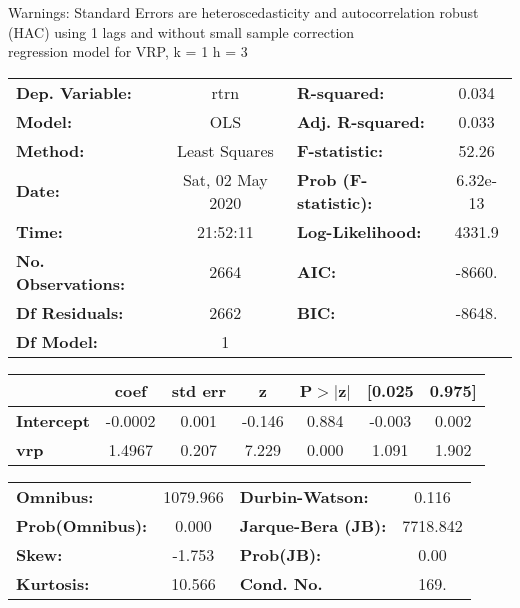 Warnings: \newline
 [1] Standard Errors are heteroscedasticity and autocorrelation robust (HAC) using 1 lags and without small sample correction\\ 

regression model for VRP, k = 1 h = 3\begin{center}
\begin{tabular}{lclc}
\toprule
\textbf{Dep. Variable:}    &       rtrn       & \textbf{  R-squared:         } &     0.034   \\
\textbf{Model:}            &       OLS        & \textbf{  Adj. R-squared:    } &     0.033   \\
\textbf{Method:}           &  Least Squares   & \textbf{  F-statistic:       } &     52.26   \\
\textbf{Date:}             & Sat, 02 May 2020 & \textbf{  Prob (F-statistic):} &  6.32e-13   \\
\textbf{Time:}             &     21:52:11     & \textbf{  Log-Likelihood:    } &    4331.9   \\
\textbf{No. Observations:} &        2664      & \textbf{  AIC:               } &    -8660.   \\
\textbf{Df Residuals:}     &        2662      & \textbf{  BIC:               } &    -8648.   \\
\textbf{Df Model:}         &           1      & \textbf{                     } &             \\
\bottomrule
\end{tabular}
\begin{tabular}{lcccccc}
                   & \textbf{coef} & \textbf{std err} & \textbf{z} & \textbf{P$> |$z$|$} & \textbf{[0.025} & \textbf{0.975]}  \\
\midrule
\textbf{Intercept} &      -0.0002  &        0.001     &    -0.146  &         0.884        &       -0.003    &        0.002     \\
\textbf{vrp}       &       1.4967  &        0.207     &     7.229  &         0.000        &        1.091    &        1.902     \\
\bottomrule
\end{tabular}
\begin{tabular}{lclc}
\textbf{Omnibus:}       & 1079.966 & \textbf{  Durbin-Watson:     } &    0.116  \\
\textbf{Prob(Omnibus):} &   0.000  & \textbf{  Jarque-Bera (JB):  } & 7718.842  \\
\textbf{Skew:}          &  -1.753  & \textbf{  Prob(JB):          } &     0.00  \\
\textbf{Kurtosis:}      &  10.566  & \textbf{  Cond. No.          } &     169.  \\
\bottomrule
\end{tabular}
\end{center}

